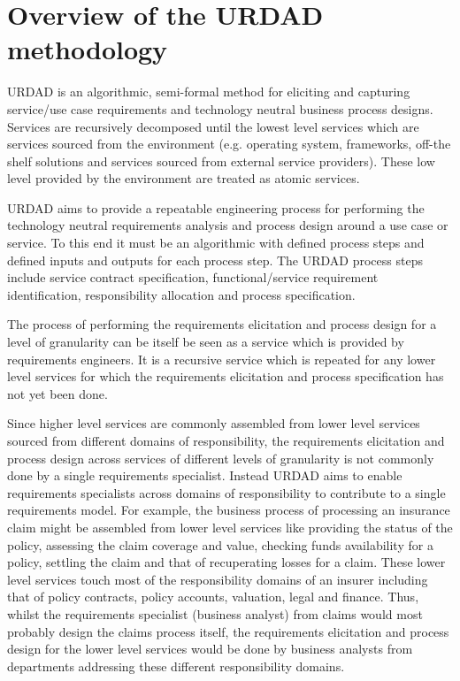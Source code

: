 \section{Overview of the URDAD methodology \label{sec:urdadMethodology}}

URDAD is an algorithmic, semi-formal method for eliciting and capturing service/use case requirements and technology neutral business process designs\cite{solms_urdad_2010}. Services are recursively decomposed until the lowest level services which are services sourced from the environment (e.g. operating system, frameworks, off-the shelf solutions and services sourced from external service providers). These low level provided by the environment are treated as atomic services.

URDAD aims to provide a repeatable engineering process for performing the technology neutral requirements analysis and process design around a use case or service. To this end it must be an algorithmic with defined process steps and defined inputs and outputs for each process step. The URDAD process steps include service contract specification, functional/service requirement identification, responsibility allocation and process specification.

The process of performing the requirements elicitation and process design for a level of granularity can be itself be seen as a service which is provided by requirements engineers. It is a recursive service which is repeated for any lower level services for which the requirements elicitation and process specification has not yet been done.

Since higher level services are commonly assembled from lower level services sourced from different domains of responsibility, the requirements elicitation and process design across services of different levels of granularity is not commonly done by a single requirements specialist. Instead URDAD aims to enable requirements specialists across domains of responsibility to contribute to a single requirements model. For example, the business process of processing an insurance claim might be assembled from lower level services like providing the status of the policy, assessing the claim coverage and value, checking funds availability for a policy, settling the claim and that of recuperating losses for a claim. These lower level services touch most of the responsibility domains of an insurer including that of policy contracts, policy accounts, valuation, legal and finance. Thus, whilst the requirements specialist (business analyst) from claims would most probably design the claims process itself, the requirements elicitation and process design for the lower level services would be done by business analysts from departments addressing these different responsibility domains. 


